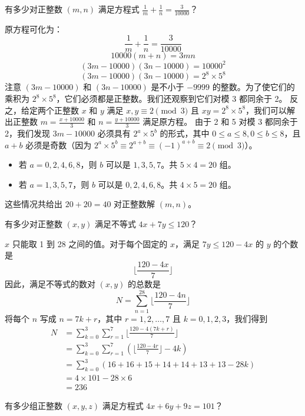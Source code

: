\begin{questions}
\question 有多少对正整数 $(m, n)$ 满足方程式 $\frac{1}{m} + \frac{1}{n} = \frac{3}{10000}$？

\begin{solution}
原方程可化为：
\[ \frac{1}{m} + \frac{1}{n} = \frac{3}{10000} \]
\[ 10000(m + n) = 3mn \]
\[ (3m - 10000)(3n - 10000) = 10000^2 \]
\[ (3m - 10000)(3n - 10000) = 2^8 \times 5^8 \]
注意 $(3m - 10000)$ 和 $(3n - 10000)$ 是不小于 $-9999$ 的整数。为了使它们的乘积为 $2^8 \times 5^8$，它们必须都是正整数。我们还观察到它们对模 3 都同余于 2。
反之，给定两个正整数 $x$ 和 $y$ 满足 $x, y \equiv 2 \pmod 3$ 且 $xy = 2^8 \times 5^8$，我们可以解出正整数 $m = \frac{x + 10000}{3}$ 和 $n = \frac{y + 10000}{3}$ 满足原方程。
由于 2 和 5 对模 3 都同余于 2，我们发现 $3m - 10000$ 必须具有 $2^a \times 5^b$ 的形式，其中 $0 \le a \le 8, 0 \le b \le 8$，且 $a + b$ 必须是奇数（因为 $2^a \times 5^b \equiv 2^{a+b} \equiv (-1)^{a+b} \equiv 2 \pmod 3$）。
\begin{itemize}
    \item 若 $a = 0, 2, 4, 6, 8$，则 $b$ 可以是 $1, 3, 5, 7$。共 $5 \times 4 = 20$ 组。
    \item 若 $a = 1, 3, 5, 7$，则 $b$ 可以是 $0, 2, 4, 6, 8$。共 $4 \times 5 = 20$ 组。
\end{itemize}
这些情况共给出 $20 + 20 = 40$ 对正整数解 $(m, n)$。
\end{solution}

\question 有多少对正整数 $(x, y)$ 满足不等式 $4x + 7y \le 120$？

\begin{solution}
$x$ 只能取 1 到 28 之间的值。对于每个固定的 $x$，满足 $7y \le 120 - 4x$ 的 $y$ 的个数是
\[ \lfloor \frac{120 - 4x}{7} \rfloor  \]
因此，满足不等式的数对 $(x, y)$ 的总数是
\[ N = \sum_{n=1}^{28} \lfloor \frac{120 - 4n}{7} \rfloor  \]
将每个 $n$ 写成 $n = 7k + r$，其中 $r = 1, 2, \dots, 7$ 且 $k = 0, 1, 2, 3$，我们得到
\begin{align}
N &= \sum_{k=0}^{3} \sum_{r=1}^{7} \lfloor \frac{120 - 4(7k + r)}{7} \rfloor \\
&= \sum_{k=0}^{3} \sum_{r=1}^{7} (\lfloor \frac{120 - 4r}{7} \rfloor - 4k) \\
&= \sum_{k=0}^{3} (16 + 16 + 15 + 14 + 14 + 13 + 13 - 28k) \\
&= 4 \times 101 - 28 \times 6 \\
&= 236 
\end{align}
\end{solution}

\question 有多少组正整数 $(x, y, z)$ 满足方程式 $4x + 6y + 9z = 101$？


\end{questions}
